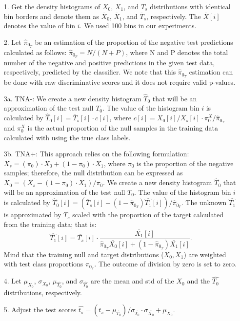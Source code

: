 \documentclass{article}
\newcommand{\edit}[1]{{\color{red}#1}}
\begin{document}
\begin{enumerate}%
	\itemsep-3pt  		
	\item [1.] Get the density histograms of $X_0$, $X_1$, and $T_s$ distributions with identical bin borders and denote them as $\overline{X}_0$, $\overline{X}_1$, and $\overline{T}_s$, respectively. The $\overline{X}[i]$ denotes the value of bin $i$.  We used 100 bins in our experiments.
	
	\item [2.] Let $\hat{\pi}_{0_T}$ be an estimation of the proportion of the negative test predictions calculated as follows: \edit{ $\hat{\pi}_{0_T} = N/(N+P)$, where N and P denotes the total number of the negative and positive predictions in the given test data, respectively, predicted by the classifier. We note that this $\hat{\pi}_{0_T}$ estimation can be done with raw discriminative scores and it does not require valid p-values.}
	
	\item [3a.] TNA-:  We create a new density histogram $\hat{T}_0$ that will be an approximation of the test null $T_0$. The value of the histogram bin $i$ is calculated  by $\hat{T}_0[i] = \overline{T}_s[i]\cdot c[i]$, where \edit{ $c[i]=X_0[i]/X_s[i]\cdot \pi^{X}_{0}/\hat{\pi}_{0_T}$ and $\pi^{X}_{0}$ is the actual proportion of the null samples in the training data calculated with using the true class labels.}
	
	\item [3b.] TNA+: This approach relies on the following formulation: $X_s = (\pi_0) \cdot X_0 + (1-\pi_0) \cdot X_1$, where $\pi_0$ is the proportion of the negative samples; therefore, the null distribution can be expressed as $X_0 = (X_s - (1-\pi_0) \cdot X_1)/\pi_0$. We create a new density histogram $\hat{T}_0$ that will be an approximation of the test null $T_0$. The value of the histogram bin $i$ is calculated  by $\hat{T}_0[i] = (\overline{T}_s[i] -  (1-\hat{\pi}_{0_T})\hat{T_1}[i])/\hat{\pi}_{0_T}$. The unknown $\hat{T_1}$ is approximated by $T_s$ scaled with the proportion of the target calculated from the training data; that is:  $$\hat{T_1}[i] = \overline{T_s}[i]\cdot \frac {\overline{X_1}[i]}{\hat{\pi}_{0_T} \overline{X_0}[i] + (1-\hat{\pi}_{0_T}) \overline{X_1}[i]}.$$ Mind that the training null and target distributions ($X_0, X_1$) are weighted with test class proportions  $\hat{\pi}_{0_T}$. The outcome of division by zero is set to zero.
		
	\item [4.] Let $\mu_{X_0}$, $\sigma_{X_0}$, $\mu_{\hat{T_0}}$, and $\sigma_{\hat{T_0}}$ are the mean and std of the $X_0$ and the $\hat{T_0}$ distributions, respectively. 
	
	\item [5.] Adjust the test scores $\hat{t_s} = (t_s-\mu_{\hat{T_0}})/\sigma_{\hat{T_0}} \cdot \sigma_{\hat{X_0}} + \mu_{X_0}$.
\end{enumerate}
\end{document}
